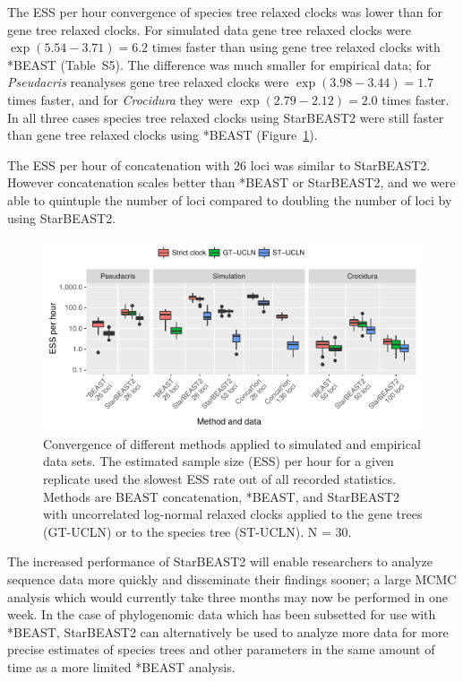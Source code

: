 \documentclass[nogrid]{MBE}%
\begin{document}
The ESS per hour convergence of species tree relaxed clocks was lower than for
gene tree relaxed clocks. For simulated data gene tree relaxed clocks were
$\exp(5.54 - 3.71) = 6.2$ times faster than using gene tree relaxed clocks
with *BEAST (Table~S5). The difference was much smaller for empirical data;
for \textit{Pseudacris} reanalyses gene tree relaxed clocks were $\exp(3.98 -
3.44) = 1.7$ times faster, and for \textit{Crocidura} they were $\exp(2.79 -
2.12) = 2.0$ times faster. In all three cases species tree relaxed clocks
using StarBEAST2 were still faster than gene tree relaxed clocks using *BEAST
(Figure~\ref{fig:essPerHourComparison}).

The ESS per hour of concatenation with 26 loci was similar to StarBEAST2.
However concatenation scales better than *BEAST or StarBEAST2, and we were
able to quintuple the number of loci compared to doubling the number of loci
by using StarBEAST2.

\begin{figure}[htb!]
\centering
\includegraphics[width=\textwidth]{minimum_ess_per_hour_comparison.pdf}
\caption
{Convergence of different methods applied to simulated and empirical data
sets. The estimated sample size (ESS) per hour for a given replicate used the
slowest ESS rate out of all recorded statistics. Methods are BEAST
concatenation, *BEAST, and StarBEAST2 with uncorrelated log-normal relaxed
clocks applied to the gene trees (GT-UCLN) or to the species tree (ST-UCLN).
N = 30.}
\label{fig:essPerHourComparison}
\end{figure}

The increased performance of StarBEAST2 will enable researchers to analyze
sequence data more quickly and disseminate their findings sooner; a large MCMC
analysis which would currently take three months may now be performed in one
week. In the case of phylogenomic data which has been subsetted for use with
*BEAST, StarBEAST2 can alternatively be used to analyze more data for more
precise estimates of species trees and other parameters in the same amount of
time as a more limited *BEAST analysis.
\end{document}
